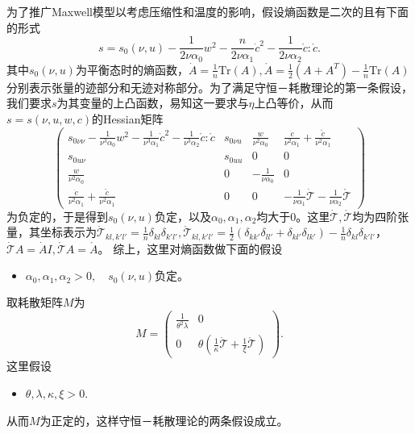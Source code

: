 	为了推广Maxwell模型以考虑压缩性和温度的影响，假设熵函数是二次的且有下面的形式
	\begin{equation}\label{eq:entropyf}
		s = s_0(\nu,u)  - \frac{1}{2\nu \alpha_0} w^2 - \frac{n}{2\nu \alpha_1} \dot{c}^2- \frac{1}{2\nu\alpha_2 } \mathring{c}:\mathring{c}.
	\end{equation}
	其中$s_0(\nu,u)$为平衡态时的熵函数，$\dot{A} = \frac{1}{n} \mbox{Tr} (A), \mathring{A} = \frac{1}{2} (A + A^T) - \frac{1}{n} \mbox{Tr} (A) $分别表示张量的迹部分和无迹对称部分。为了满足守恒－耗散理论的第一条假设，我们要求$s$为其变量的上凸函数，易知这一要求与$\eta$上凸等价，从而$s=s(\nu,u,w,c)$的Hessian矩阵
	\begin{equation*}
		\left(    \begin{array}{cccc}
			s_{0\nu\nu} - \frac{1}{\nu^3 \alpha_0} w^2 - \frac{1}{\nu^3 \alpha_1} \dot{c}^2- \frac{1}{\nu^3 \alpha_2} \mathring{c}:\mathring{c} & s_{0\nu u} & \frac{w}{\nu^2 \alpha_0} & \frac{\dot{c}}{\nu^2 \alpha_1} + \frac{\mathring{c}}{\nu^2 \alpha_1} \\
			s_{0u\nu} & s_{0uu} & 0 & 0 \\
			\frac{w}{\nu^2\alpha_0} & 0 & -\frac{1}{\nu \alpha_0} & 0 \\
			\frac{\dot{c}}{\nu^2 \alpha_1} + \frac{\mathring{c}}{\nu^2 \alpha_1} & 0 & 0 & -\frac{1}{\nu \alpha_1} \dot{\mathcal{T}}  -\frac{1}{\nu \alpha_2} \mathring{\mathcal{T}} 
		\end{array} \right)
	\end{equation*}
	为负定的，于是得到$s_0(\nu,u)$负定，以及$\alpha_0,\alpha_1,\alpha_2$均大于$0$。这里$\dot{\mathcal{T}}, \mathring{\mathcal{T}}$均为四阶张量，其坐标表示为$\dot{\mathcal{T}}_{kl,k'l'} = \frac{1}{n}\delta_{kl} \delta_{k'l'}, \mathring{\mathcal{T}}_{kl,k'l'} =\frac{1}{2}(\delta_{kk'}\delta_{ll'} + \delta_{kl'} \delta_{lk'} ) -\frac{1}{n}\delta_{kl} \delta_{k'l'} $，$\dot{\mathcal{T}} A = \dot{A} I,\mathring{\mathcal{T}} A = \mathring{A}$。
	综上，这里对熵函数做下面的假设
	\begin{itemize}
		\item $\alpha_0,\alpha_1,\alpha_2>0, \quad s_0(\nu,u) \text{负定。}$
	\end{itemize}

	取耗散矩阵$M$为
	\begin{equation*}
		M = \left( \begin{array}{ccc} 
			\frac{1}{\theta^2 \lambda} & 0 \\
			0 &  \theta(\frac{1}{\kappa} \dot{\mathcal{T}} + \frac{1}{\xi} \mathring{\mathcal{T}})  
		\end{array} \right).
	\end{equation*}
	这里假设
	\begin{itemize}
		\item $\theta,\lambda,\kappa,\xi > 0$.
	\end{itemize}
	从而$M$为正定的，这样守恒－耗散理论的两条假设成立。

